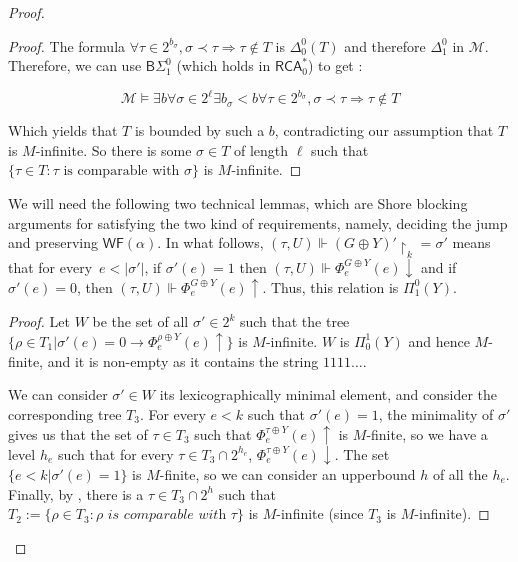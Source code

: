 \documentclass{article}
\numberwithin{theorem}{section}
\newtheorem{lemma}[theorem]{Lemma}
\newcommand{\RCA}{\mathsf{RCA}}
\newcommand{\BSig}{\mathsf{B}\Sigma^0}
\newcommand{\WF}{\mathsf{WF}}
\newcommand{\M}{\mathcal{M}}
\newcommand{\uh}[0]{{\upharpoonright}}
\begin{document}
\begin{proof}
\begin{proof}
    The formula $\forall \tau \in 2^{b_{\sigma}}, \sigma \prec \tau \Rightarrow \tau \notin T$ is $\Delta_0^0(T)$ and therefore $\Delta_1^0$ in $\M$. Therefore, we can use $\BSig_1$ (which holds in $\RCA_0^*$) to get :

\[\M \models \exists b \forall \sigma \in 2^\ell \exists b_{\sigma} < b  \forall \tau \in 2^{b_{\sigma}}, \sigma \prec \tau \Rightarrow \tau \notin T\]

Which yields that $T$ is bounded by such a $b$, contradicting our assumption that $T$ is $M$-infinite. So there is some $\sigma \in T$ of length $\ell$ such that $\{ \tau \in T : \tau \mbox{ is comparable with } \sigma \}$ is $M$-infinite. 
\end{proof}

We will need the following two technical lemmas, which are Shore blocking arguments for satisfying the two kind of requirements, namely, deciding the jump and preserving $\WF(\alpha)$. 
In what follows, $(\tau, U) \Vdash (G \oplus Y)' \uh_k = \sigma'$ means that for every~$e < |\sigma'|$, if $\sigma'(e) = 1$ then $(\tau, U) \Vdash \Phi^{G \oplus Y}_e(e)\downarrow$ and if $\sigma'(e) = 0$, then $(\tau, U) \Vdash \Phi^{G \oplus Y}_e(e)\uparrow$. Thus, this relation is $\Pi^0_1(Y)$.



\begin{proof}
Let $W$ be the set of all $\sigma' \in 2^k$ such that the tree $\{\rho \in T_1 | \sigma'(e) = 0 \to \Phi_e^{\rho \oplus Y}(e) \uparrow\}$ is $M$-infinite. $W$ is $\Pi_0^1(Y)$ and hence $M$-finite, and it is non-empty as it contains the string $1111\dots$.

We can consider $\sigma' \in W$ its lexicographically minimal element, and consider the corresponding tree $T_3$. For every $e < k$ such that $\sigma'(e) = 1$, the minimality of $\sigma'$ gives us that the set of $\tau \in T_3$ such that $\Phi_e^{\tau \oplus Y}(e) \uparrow$ is $M$-finite, so we have a level $h_e$ such that for every $\tau \in T_3 \cap 2^{h_e}$, $\Phi_e^{\tau \oplus Y}(e) \downarrow$. The set $\{e<k|\sigma'(e) = 1\}$ is $M$-finite, so we can consider an upperbound $h$ of all the $h_e$. Finally, by , there is a $\tau \in T_3 \cap 2^{h}$ such that $T_2 := \{\rho \in T_3 : \rho \textit{ is comparable with } \tau\}$ is $M$-infinite (since $T_3$ is $M$-infinite).


\end{proof}
\end{proof}
\end{document}
